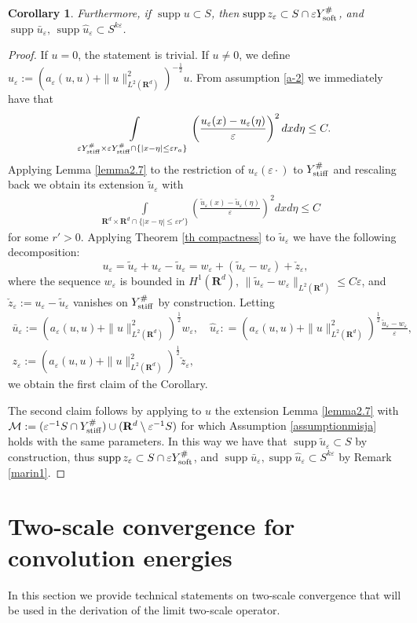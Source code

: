 \documentclass[11pt]{article}
\newcommand\e {\varepsilon}
\newcommand\stiff{{\rm stiff}}
\newcommand\soft{{\rm soft}}
\newcommand{\ext}[1]{\widetilde{#1}}
\def\RR{\R}
\newcommand{\R}{\mathbf{R}}
\def\M{\mathcal{M}}
\newcommand\supp{\mathop{\operatorname{supp}}}
\newtheorem{corollary}[theorem]{Corollary}
\theoremstyle{remark}
\begin{document}
\begin{appendices}
\begin{corollary}
	Furthermore, if $\supp u \subset S$, then $\supp z_\e \subset S\cap \e Y_\soft^\#$, and $\supp \bar{u}_\e, \,\supp\hat{u}_\e \subset S^{k\e}$.
\end{corollary} 	
\begin{proof}
	If $u=0$, the statement is trivial. If $u\not= 0$, we define $u_\e:=(a_\e (u,u)+\|u\|^2_{L^2(\RR^d)})^{-\frac12} u$. From assumption \eqref{a-2} we immediately have that
	\begin{equation*}
		\int\limits_{ \e  Y_\stiff^{\#} \times  \e  Y_\stiff^{\#} \cap \{|x-\eta|\leq \e r_a\}} \left(\frac{ u_\e(x) - u_\e(\eta)}\e \right)^2 dx d\eta \leq C.
	\end{equation*}
	Applying Lemma \ref{lemma2.7} to the restriction of $u_\e(\e \cdot)$ to $Y^\#_{\rm stiff}$ and rescaling back we obtain its extension  $\widetilde{u}_\e $ with
	\begin{align*}
		&\int\limits_{\R^d\times \R^d \cap \{|x-\eta|\leq \e r'\}}
		\left(\frac{\widetilde u_\e(x) -\widetilde u_\e(\eta)}\e \right)^2 dx d\eta  \leq  C
	\end{align*}
	for some $r'>0$. Applying  Theorem \ref{th compactness} to $\widetilde{u}_\e$ we have the following decomposition:
	$$
	u_\e= \widetilde u_\e+ u_\e-\widetilde u_\e=w_\e +(\widetilde{u}_\e -w_\e )+\check z_\e ,
	$$
	where the sequence $w_\e$ is bounded in $H^1(\R^d)$, $\|\widetilde{u}_\e -w_\e\|_{L^2(\R^d)} \leq C\e$, and $\check z_\e := u_\e-\widetilde{u}_\e $ vanishes on $Y^\#_{\rm stiff}$ by construction. Letting
	$$
	\begin{gathered}
		\bar{u}_\e :=(a_\e (u,u)+\|u\|^2_{L^2(\RR^d)})^\frac12w_\e , \quad \hat{u}_\e: =(a_\e (u,u)+\|u\|^2_{L^2(\RR^d)})^\frac12\frac{\widetilde{u}_\e -w_\e }\e,
		\\
		z_\e :=(a_\e (u,u)+\|u\|^2_{L^2(\RR^d)})^\frac12\check z_\e,
	\end{gathered}
	$$
	we obtain the first claim of the Corollary.
	
	The second claim follows by applying to $u$ the extension Lemma \ref{lemma2.7} with $\M:= (\e^{-1}S\cap Y_\stiff^\#) \cup (\R^d\setminus\e^{-1}S)$ for which Assumption \ref{assumptionmisja} holds with the same parameters. In this way we have that $\supp \ext{u}_\e \subset S$ by construction, thus $\supp z_\e \subset S\cap \e Y_\soft^\#$, and $\supp \bar{u}_\e ,\supp\hat{u}_\e \subset S^{k\e}$ by Remark \ref{marin1}.
\end{proof}	

\section{Two-scale convergence for convolution energies}\label{a3}
In this section we provide technical statements on two-scale convergence  that will be used in the derivation of the limit two-scale operator.


\end{appendices}
\end{document}

